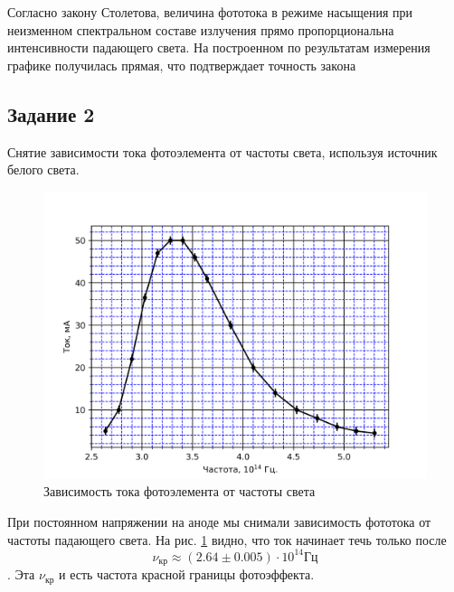 Согласно закону Столетова, величина фототока в режиме насыщения при неизменном
спектральном составе излучения прямо пропорциональна интенсивности падающего света.
На построенном по результатам измерения графике получилась прямая, что подтверждает
точность закона

\subsection{Задание 2}
Снятие зависимости тока фотоэлемента от частоты света, используя источник белого света.
\begin{figure}[H]
	\centering
	\includegraphics[width=\linewidth]{graphs/pt2}
	\caption{ Зависимость тока фотоэлемента от частоты света }
	\label{fig:6}
\end{figure}
При постоянном напряжении на аноде мы снимали зависимость фототока от частоты падающего света. На рис. \ref{fig:6}
видно, что ток начинает течь только после $$\nu_{\text{кр}}\approx (2.64 \pm 0.005)\cdot10^{14} \text{Гц}$$. Эта $\nu_{\text{кр}}$ и есть частота красной
границы фотоэффекта. 

